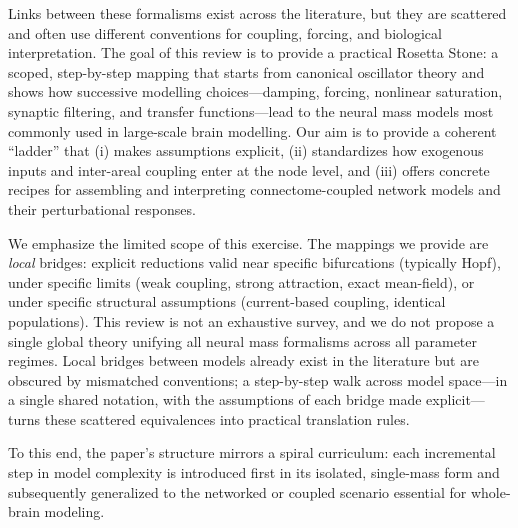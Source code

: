 \documentclass[11pt]{article}
\numberwithin{equation}{section}
\newcommand{\rev}[1]{\begingroup\color{black}#1\endgroup}
\begin{document}
\rev{Links between these formalisms exist across the literature, but they are scattered and often use different conventions for coupling, forcing, and biological interpretation. The goal of this review is to provide a practical Rosetta Stone: a scoped, step-by-step mapping that starts from canonical oscillator theory and shows how successive modelling choices—damping, forcing, nonlinear saturation, synaptic filtering, and transfer functions—lead to the neural mass models most commonly used in large-scale brain modelling. Our aim is to provide a coherent “ladder” that (i) makes assumptions explicit, (ii) standardizes how exogenous inputs and inter-areal coupling enter at the node level, and (iii) offers concrete recipes for assembling and interpreting connectome-coupled network models and their perturbational responses.

We emphasize the limited scope of this exercise. The mappings we provide are \emph{local} bridges: explicit reductions valid near specific bifurcations (typically Hopf), under specific limits (weak coupling, strong attraction, exact mean-field), or under specific structural assumptions (current-based coupling, identical populations). This review is not an exhaustive survey, and we do not propose a single global theory unifying all neural mass formalisms across all parameter regimes. Local bridges between models already exist in the literature but are obscured by mismatched conventions; a step-by-step walk across model space---in a single shared notation, with the assumptions of each bridge made explicit---turns these scattered equivalences into practical translation rules.}

To this end, the paper's structure mirrors a spiral curriculum: each incremental step in model complexity is introduced first in its isolated, single-mass form and subsequently generalized to the networked or coupled scenario essential for whole-brain modeling.  
\end{document}
